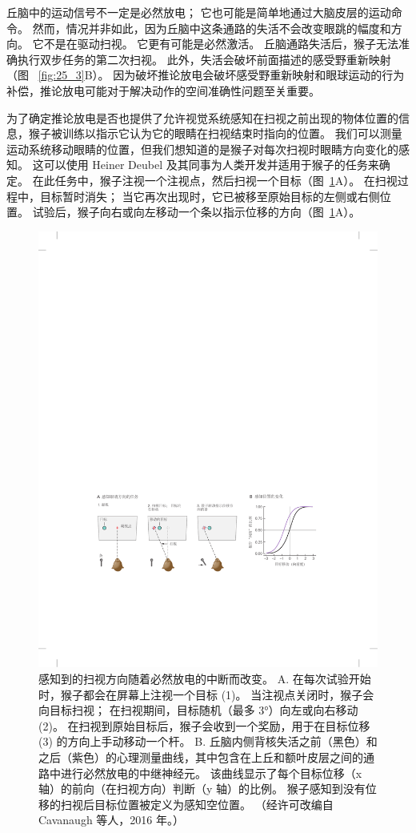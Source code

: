 丘脑中的运动信号不一定是必然放电；
它也可能是简单地通过大脑皮层的运动命令。
然而，情况并非如此，因为丘脑中这条通路的失活不会改变眼跳的幅度和方向。
它不是在驱动扫视。
它更有可能是必然激活。
丘脑通路失活后，猴子无法准确执行双步任务的第二次扫视。
此外，失活会破坏前面描述的感受野重新映射（图 ~\ref{fig:25_3}B）。
因为破坏推论放电会破坏感受野重新映射和眼球运动的行为补偿，推论放电可能对于解决动作的空间准确性问题至关重要。


为了确定推论放电是否也提供了允许视觉系统感知在扫视之前出现的物体位置的信息，猴子被训练以指示它认为它的眼睛在扫视结束时指向的位置。
我们可以测量运动系统移动眼睛的位置，但我们想知道的是猴子对每次扫视时眼睛方向变化的感知。
这可以使用 Heiner Deubel 及其同事为人类开发并适用于猴子的任务来确定。
在此任务中，猴子注视一个注视点，然后扫视一个目标（图~\ref{fig:25_5}A）。
在扫视过程中，目标暂时消失；
当它再次出现时，它已被移至原始目标的左侧或右侧位置。
试验后，猴子向右或向左移动一个条以指示位移的方向（图~\ref{fig:25_5}A）。


\begin{figure}[htbp]
	\centering
	\includegraphics[width=0.8\linewidth]{chap25/fig_25_5}
	\caption{感知到的扫视方向随着必然放电的中断而改变。 A. 在每次试验开始时，猴子都会在屏幕上注视一个目标 (1)。 当注视点关闭时，猴子会向目标扫视； 在扫视期间，目标随机（最多 3°）向左或向右移动 (2)。 在扫视到原始目标后，猴子会收到一个奖励，用于在目标位移 (3) 的方向上手动移动一个杆。 B. 丘脑内侧背核失活之前（黑色）和之后（紫色）的心理测量曲线，其中包含在上丘和额叶皮层之间的通路中进行必然放电的中继神经元。 该曲线显示了每个目标位移（x 轴）的前向（在扫视方向）判断（y 轴）的比例。 猴子感知到没有位移的扫视后目标位置被定义为感知空位置。 （经许可改编自 Cavanaugh 等人，2016 年。）}
	\label{fig:25_5}
\end{figure}


